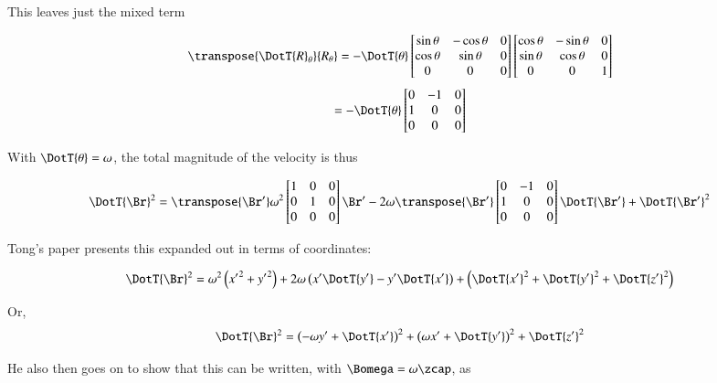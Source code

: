 This leaves just the mixed term

\[
\transpose{\DotT{R}_{\theta}} {R_{\theta}}
=
-{\DotT{\theta}}
\begin{bmatrix}
\sin \theta & -\cos \theta & 0 \\
\cos \theta & \sin \theta & 0 \\
0 & 0 & 0 \\
\end{bmatrix}
\begin{bmatrix}
\cos \theta & -\sin \theta & 0 \\
\sin \theta & \cos \theta & 0 \\
0 & 0 & 1 \\
\end{bmatrix}
\]
\[
=
-{\DotT{\theta}}
\begin{bmatrix}
0 & -1 & 0 \\
1 & 0 & 0 \\
0 & 0 & 0 \\
\end{bmatrix}
\]

With $\DotT{\theta} = \omega$, the total magnitude of the velocity is thus

\[
\DotT{\Br}^2 = 
\transpose{\Br'} 
\omega^2
\begin{bmatrix}
1 & 0 & 0 \\
0 & 1 & 0 \\
0 & 0 & 0 \\
\end{bmatrix}
\Br'
-2 \omega \transpose{{\Br'}} 
\begin{bmatrix}
0 & -1 & 0 \\
1 & 0 & 0 \\
0 & 0 & 0 \\
\end{bmatrix}
\DotT{\Br'}
+ {\DotT{\Br'}}^2
\]

Tong's paper presents this expanded out in terms of coordinates:

\[
\DotT{\Br}^2 = 
\omega^2\left( {x'}^{2} + {y'}^{2} \right)
+ 2 \omega \left( x' \DotT{y'} -y' \DotT{x'} \right)
+ \left( \DotT{x'}^{2} + \DotT{y'}^{2} + \DotT{z'}^{2} \right)
\]

Or,
\begin{equation}\label{eqn:keRot:vmagwithmatrix}
\DotT{\Br}^2 = 
\left( -\omega y' + \DotT{x'} \right)^2 
+\left( \omega x' + \DotT{y'} \right)^2 
+ \DotT{z'}^2 
\end{equation}

He also then goes on to
show that this can be written, with $\Bomega = \omega \zcap$, as 

